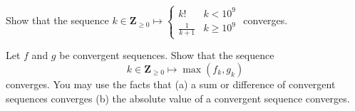 \documentclass[12pt,fleqn,answers]{exam}
\newcommand{\integers}{\mathbf{Z}}
\begin{document}
\begin{questions}
\question [10] Show that the sequence 
$k \in \integers_{\geq 0} \mapsto \begin{cases}
k! & k <  10^9 \\ \frac{1}{k+1} & k \geq   10^9 \end{cases}$ converges.

\begin{solution}

\end{solution}



\question [10] Let $f$ and $g$ be convergent sequences. Show that the sequence
\begin{equation*}
   k \in \integers_{\geq 0} \mapsto \max(f_k, g_k)
\end{equation*}
converges.  You may use the facts that (a) a sum or difference of convergent
sequences converges (b) the absolute value of a convergent sequence converges.


\end{questions}
\end{document}
